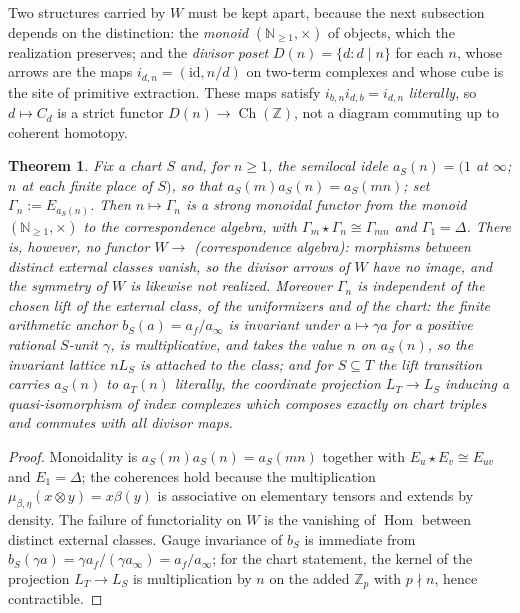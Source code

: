 \documentclass[11pt]{amsart}
\newtheorem{theorem}{Theorem}[section]
\theoremstyle{definition}
\theoremstyle{remark}
\newcommand{\N}{\mathbb N}
\newcommand{\Z}{\mathbb Z}
\newcommand{\Hom}{\operatorname{Hom}}
\newcommand{\Ch}{\operatorname{Ch}}
\begin{document}
Two structures carried by $W$ must be kept apart, because the next subsection
depends on the distinction: the \emph{monoid} $(\N_{\ge1},\times)$ of objects, which
the realization preserves; and the \emph{divisor poset} $D(n)=\{d:d\mid n\}$
for each $n$, whose arrows are the maps $i_{d,n}=(\mathrm{id},n/d)$ on
two-term complexes and whose cube is the site of primitive extraction. These
maps satisfy $i_{b,n}i_{d,b}=i_{d,n}$ \emph{literally}, so $d\mapsto C_d$ is a
strict functor $D(n)\to\Ch(\Z)$, not a diagram commuting up to coherent
homotopy.

\begin{theorem}\label{thm:realization}
Fix a chart $S$ and, for $n\ge1$, the semilocal idele
$a_S(n)=(1$ at $\infty$; $n$ at each finite place of $S)$, so that
$a_S(m)a_S(n)=a_S(mn)$; set $\Gamma_n:=E_{a_S(n)}$. Then $n\mapsto\Gamma_n$ is
a strong monoidal functor from the monoid $(\N_{\ge1},\times)$ to the
correspondence algebra, with $\Gamma_m\star\Gamma_n\cong\Gamma_{mn}$ and
$\Gamma_1=\Delta$. There is, however, \emph{no} functor $W\to$ (correspondence
algebra): morphisms between distinct external classes vanish, so the divisor
arrows of $W$ have no image, and the symmetry of $W$ is likewise not realized.
Moreover $\Gamma_n$ is independent of the chosen lift of the external class, of
the uniformizers and of the chart: the finite arithmetic anchor
$b_S(a)=a_f/a_\infty$ is invariant under $a\mapsto\gamma a$ for a positive
rational $S$-unit $\gamma$, is multiplicative, and takes the value $n$ on
$a_S(n)$, so the invariant lattice $nL_S$ is attached to the class; and for
$S\subseteq T$ the lift transition carries $a_S(n)$ to $a_T(n)$ literally, the
coordinate projection $L_T\to L_S$ inducing a quasi-isomorphism of index
complexes which composes exactly on chart triples and commutes with all divisor
maps.
\end{theorem}

\begin{proof}
Monoidality is $a_S(m)a_S(n)=a_S(mn)$ together with $E_u\star E_v\cong E_{uv}$
and $E_1=\Delta$; the coherences hold because the multiplication
$\mu_{\beta,\eta}(x\otimes y)=x\beta(y)$ is associative on elementary tensors
and extends by density. The failure of functoriality on $W$ is the vanishing of
$\Hom$ between distinct external classes. Gauge invariance of $b_S$ is
immediate from $b_S(\gamma a)=\gamma a_f/(\gamma a_\infty)=a_f/a_\infty$; for
the chart statement, the kernel of the projection $L_T\to L_S$ is multiplication
by $n$ on the added $\Z_p$ with $p\nmid n$, hence contractible.
\end{proof}
\end{document}
